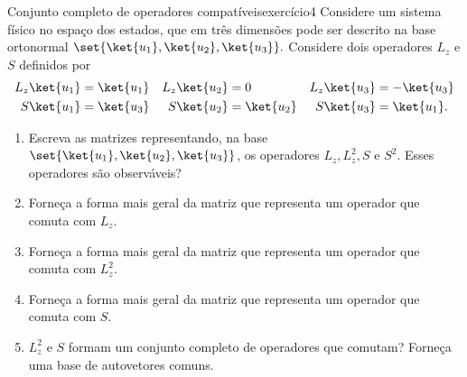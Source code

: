 \begin{exercício}{Conjunto completo de operadores compatíveis}{exercício4}
    Considere um sistema físico no espaço dos estados, que em três dimensões pode ser descrito na base ortonormal \(\set{\ket{u_1}, \ket{u_2}, \ket{u_3}}.\) Considere dois operadores \(L_z\) e \(S\) definidos por
    \begin{align*}
        L_z\ket{u_1} & = \ket{u_1}&
        L_z\ket{u_2} & = 0&
        L_z\ket{u_3} & = -\ket{u_3}\\
        S\ket{u_1} & = \ket{u_3}&
        S\ket{u_2} & = \ket{u_2}&
        S\ket{u_3} & = \ket{u_1}.
    \end{align*}
    \begin{enumerate}[label=(\alph*)]
        \item Escreva as matrizes representando, na base \(\set{\ket{u_1}, \ket{u_2}, \ket{u_3}}\), os operadores \(L_z, L_z^2, S\) e \(S^2\). Esses operadores são observáveis?
        \item Forneça a forma mais geral da matriz que representa um operador que comuta com \(L_z\).
        \item Forneça a forma mais geral da matriz que representa um operador que comuta com \(L_z^2\).
        \item Forneça a forma mais geral da matriz que representa um operador que comuta com \(S\).
        \item \(L_z^2\) e \(S\) formam um conjunto completo de operadores que comutam? Forneça uma base de autovetores comuns.
    \end{enumerate}
\end{exercício}
